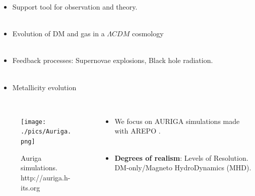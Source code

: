 \documentclass[xcolor=dvipsnames]{beamer}
\begin{document}
\begin{frame}

\begin{itemize}
\item Support tool for observation and theory.\\~\\

\item Evolution of DM and gas in a $\Lambda CDM$ cosmology\\~\\

\item Feedback processes: Supernovae explosions, Black hole radiation.\\~\\

\item Metallicity evolution\\~\\

\end{itemize}

\end{frame}


\begin{frame}

\begin{columns}[c]

\begin{column}{.5\textwidth}
\begin{figure}
\texttt{[image: ./pics/Auriga.png]}
\caption{\tiny Auriga simulations. http://auriga.h-its.org}
\end{figure}
\end{column}

\begin{column}{.6\textwidth}
\centering
\footnotesize
\begin{itemize}


\item We focus on AURIGA \cite{auriga} simulations made with AREPO \cite{arepo}.\\~\\

\item \textbf{Degrees of realism}: Levels of Resolution. DM-only/Magneto HydroDynamics (MHD).\\~\\

\end{itemize}

\end{column}

\end{columns}

\end{frame}
\end{document}
